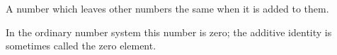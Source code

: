 A number which leaves other numbers the same when it is added to them.
\par
In the ordinary number system this number is zero;
the additive identity is sometimes called the zero element.